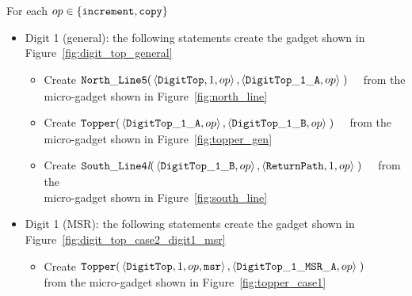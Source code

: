 For each $op \in \{ {\tt increment, copy } \}$
    \begin{itemize}

        \item Digit 1 (general): the following statements create the gadget shown in Figure~\ref{fig:digit_top_general}
        \begin{itemize}
            \item Create
            $\begin{aligned}[t]
                {\tt North\_Line5}(& \left \langle {\tt DigitTop}, 1,    op \right\rangle,
                                     \left \langle {\tt DigitTop\_1\_A}, op \right\rangle \;)
            \end{aligned}$ from the micro-gadget shown in Figure~\ref{fig:north_line}

            \item Create
            $\begin{aligned}[t]
                {\tt Topper}(& \left \langle {\tt DigitTop\_1\_A}, op \right\rangle,
                               \left \langle {\tt DigitTop\_1\_B}, op \right\rangle \;)
            \end{aligned}$ from the micro-gadget shown in Figure~\ref{fig:topper_gen}

            \item Create
            $\begin{aligned}[t]
                {\tt South\_Line4\textit{l}}(& \left\langle {\tt DigitTop\_1\_B}, op \right\rangle,
                                               \left\langle {\tt ReturnPath}, 1,       op \right\rangle \;)
            \end{aligned}$ from the\\micro-gadget shown in Figure~\ref{fig:south_line}
        \end{itemize}
        \vspace{1cm}

        \item Digit 1 (MSR): the following statements create the gadget shown in Figure~\ref{fig:digit_top_case2_digit1_msr}
        \begin{itemize}
            \item Create
            $\begin{aligned}[t]
                {\tt Topper}(& \left\langle {\tt DigitTop}, 1,          op, {\tt msr} \right\rangle,
                               \left\langle {\tt DigitTop\_1\_MSR\_A},  op            \right\rangle \;)
            \end{aligned}$ \\ from the micro-gadget shown in Figure~\ref{fig:topper_case1}



\end{itemize}
\end{itemize}
